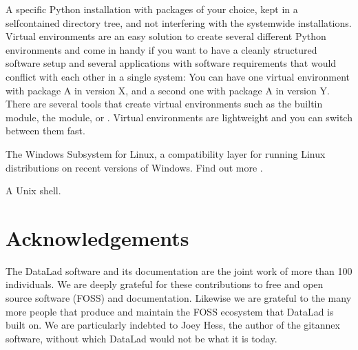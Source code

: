 \begin{description}
\sphinxAtStartPar
A specific Python installation with packages of your choice, kept in a self\sphinxhyphen{}contained directory tree, and not interfering with the system\sphinxhyphen{}wide installations.
Virtual environments are an easy solution to create several different Python environments and come in handy if you want to have a cleanly structured software setup and several applications with software requirements that would conflict with each other in a single system: You can have one virtual environment with package A in version X, and a second one with package A in version Y.
There are several tools that create virtual environments such as the built\sphinxhyphen{}in  module, the  module, or {\hyperref[\detokenize{glossary:term-conda}]{}}.
Virtual environments are light\sphinxhyphen{}weight and you can switch between them fast.

\sphinxAtStartPar
The Windows Subsystem for Linux, a compatibility layer for running Linux distributions on recent versions of Windows. Find out more .

\ignorespaces 
\sphinxAtStartPar
A Unix shell.

\end{description}

\sphinxstepscope


\section{Acknowledgements}
\label{\detokenize{acknowledgements:acknowledgements}}\label{\detokenize{acknowledgements::doc}}
\sphinxAtStartPar
The DataLad software and its documentation are the joint work of more than 100 individuals.
We are deeply grateful for these contributions to free and open source software (FOSS) and documentation.
Likewise we are grateful to the many more people that produce and maintain the FOSS ecosystem that DataLad is built on.
We are particularly indebted to Joey Hess, the author of the git\sphinxhyphen{}annex software, without which DataLad would not be what it is today.

